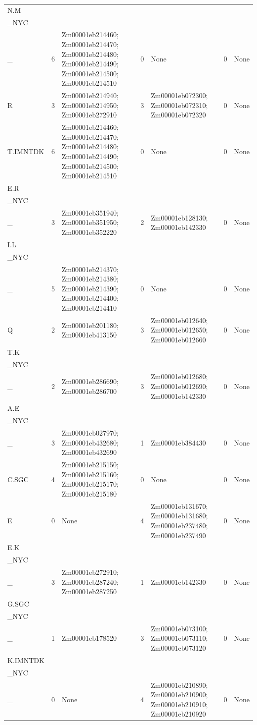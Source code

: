 \begin{longtable}{p{1.9cm}p{0.9cm}p{4.8cm}p{0.9cm}p{4.8cm}p{0.9cm}p{3.2cm}}
N.M\\_NYC\\_ & 6 & Zm00001eb214460; Zm00001eb214470; Zm00001eb214480; Zm00001eb214490; Zm00001eb214500; Zm00001eb214510 & 0 & None & 0 & None \\
R & 3 & Zm00001eb214940; Zm00001eb214950; Zm00001eb272910 & 3 & Zm00001eb072300; Zm00001eb072310; Zm00001eb072320 & 0 & None \\
T.IMNTDK & 6 & Zm00001eb214460; Zm00001eb214470; Zm00001eb214480; Zm00001eb214490; Zm00001eb214500; Zm00001eb214510 & 0 & None & 0 & None \\
E.R\\_NYC\\_ & 3 & Zm00001eb351940; Zm00001eb351950; Zm00001eb352220 & 2 & Zm00001eb128130; Zm00001eb142330 & 0 & None \\
I.L\\_NYC\\_ & 5 & Zm00001eb214370; Zm00001eb214380; Zm00001eb214390; Zm00001eb214400; Zm00001eb214410 & 0 & None & 0 & None \\
Q & 2 & Zm00001eb201180; Zm00001eb413150 & 3 & Zm00001eb012640; Zm00001eb012650; Zm00001eb012660 & 0 & None \\
T.K\\_NYC\\_ & 2 & Zm00001eb286690; Zm00001eb286700 & 3 & Zm00001eb012680; Zm00001eb012690; Zm00001eb142330 & 0 & None \\
A.E\\_NYC\\_ & 3 & Zm00001eb027970; Zm00001eb432680; Zm00001eb432690 & 1 & Zm00001eb384430 & 0 & None \\
C.SGC & 4 & Zm00001eb215150; Zm00001eb215160; Zm00001eb215170; Zm00001eb215180 & 0 & None & 0 & None \\
E & 0 & None & 4 & Zm00001eb131670; Zm00001eb131680; Zm00001eb237480; Zm00001eb237490 & 0 & None \\
E.K\\_NYC\\_ & 3 & Zm00001eb272910; Zm00001eb287240; Zm00001eb287250 & 1 & Zm00001eb142330 & 0 & None \\
G.SGC\\_NYC\\_ & 1 & Zm00001eb178520 & 3 & Zm00001eb073100; Zm00001eb073110; Zm00001eb073120 & 0 & None \\
K.IMNTDK\\_NYC\\_ & 0 & None & 4 & Zm00001eb210890; Zm00001eb210900; Zm00001eb210910; Zm00001eb210920 & 0 & None \\

\end{longtable}
